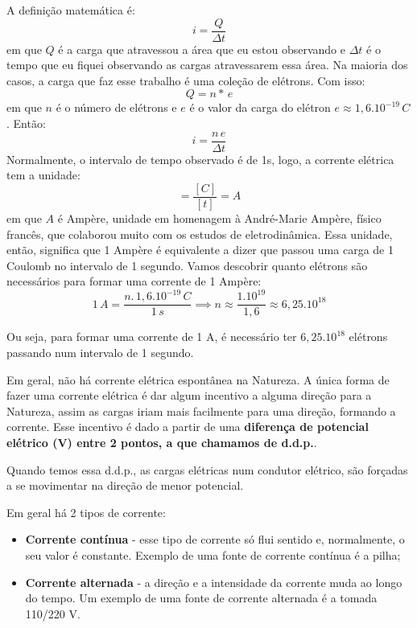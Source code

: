 \documentclass[12pt]{extarticle}
\newcommand{\<}{\langle}
\renewcommand{\>}{\rangle}
\theoremstyle{definition}
\begin{document}
A definição matemática é:
\begin{equation}
    i = \frac{Q}{\Delta t}
\end{equation}
\noindent em que $Q$ é a carga que atravessou a área que eu estou observando e $\Delta t$ é o tempo que eu fiquei observando as cargas atravessarem essa área. Na maioria dos casos, a carga que faz esse trabalho é uma coleção de elétrons. Com isso:
\begin{equation}
    Q = n*\,e
\end{equation}
\noindent em que $n$ é o número de elétrons e $e$ é o valor da carga do elétron $e\approx 1,6.10^{-19}\, C$. Então:
\begin{equation}
    \boxed{i = \frac{n\,e}{\Delta t}}
\end{equation}
Normalmente, o intervalo de tempo observado é de 1s, logo, a corrente elétrica tem a unidade:
\begin{equation}
    [i]=\frac{[C]}{[t]} = A
\end{equation}
\noindent em que $A$ é Ampère, unidade em homenagem à André-Marie Ampère, físico francês, que colaborou muito com os estudos de eletrodinâmica. Essa unidade, então, significa que 1 Ampère é equivalente a dizer que passou uma carga de 1 Coulomb no intervalo de 1 segundo. Vamos descobrir quanto elétrons são necessários para formar uma corrente de 1 Ampère:
\begin{equation}
    1\,A = \frac{n.\,1,6.10^{-19}\,C}{1\, s} \implies n \approx \frac{1.10^{19}}{1,6} \approx 6,25.10^{18}
\end{equation}

Ou seja, para formar uma corrente de 1 A, é necessário ter $6,25.10^{18}$ elétrons passando num intervalo de 1 segundo.

Em geral, não há corrente elétrica espontânea na Natureza. A única forma de fazer uma corrente elétrica é dar algum incentivo a alguma direção para a Natureza, assim as cargas iriam mais facilmente para uma direção, formando a corrente. Esse incentivo é dado a partir de uma \textbf{diferença de potencial elétrico (V) entre 2 pontos, a que chamamos de d.d.p.}. 

Quando temos essa d.d.p., as cargas elétricas num condutor elétrico, são forçadas a se movimentar na direção de menor potencial.

Em geral há 2 tipos de corrente:
\begin{itemize}
    \item \textbf{Corrente contínua} - esse tipo de corrente só flui sentido e, normalmente, o seu valor é constante. Exemplo de uma fonte de corrente contínua é a pilha;
    \item \textbf{Corrente alternada} - a direção e a intensidade da corrente muda ao longo do tempo. Um exemplo de uma fonte de corrente alternada é a tomada 110/220 V.
\end{itemize}
\end{document}
